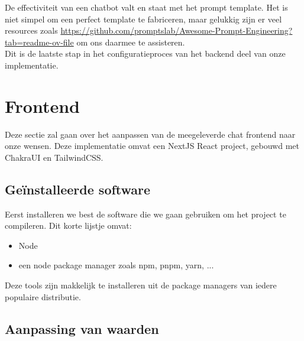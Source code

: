 De effectiviteit van een chatbot valt en staat met het prompt template. 
Het is niet simpel om een perfect template te fabriceren, maar gelukkig zijn er veel resources zoals \url{https://github.com/promptslab/Awesome-Prompt-Engineering?tab=readme-ov-file}
om ons daarmee te assisteren. \\

Dit is de laatste stap in het configuratieproces van het backend deel van onze implementatie. 

\newpage
\section{Frontend}
Deze sectie zal gaan over het aanpassen van de meegeleverde chat frontend naar onze wensen. 
Deze implementatie omvat een NextJS React project, gebouwd met ChakraUI en TailwindCSS. 

\subsection{Geïnstalleerde software}
Eerst installeren we best de software die we gaan gebruiken om het project te compileren. 
Dit korte lijstje omvat:

\begin{itemize}
    \item Node
    \item een node package manager zoals npm, pnpm, yarn, ... 
\end{itemize}

Deze tools zijn makkelijk te installeren uit de package managers van iedere populaire distributie. 

\subsection{Aanpassing van waarden}
